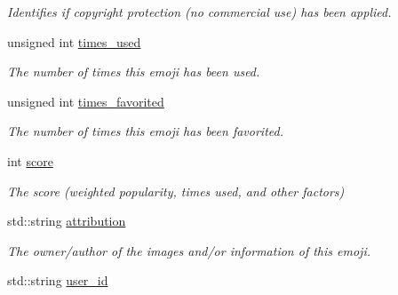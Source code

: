 \begin{DoxyCompactItemize}
\begin{DoxyCompactList}\small\item\em Identifies if copyright protection (no commercial use) has been applied. \end{DoxyCompactList}\item 
unsigned int \hyperlink{classEmojidex_1_1Data_1_1Emoji_a12b0bac434266f28c90f4029cf345281}{times\+\_\+used}\hypertarget{classEmojidex_1_1Data_1_1Emoji_a12b0bac434266f28c90f4029cf345281}{}\label{classEmojidex_1_1Data_1_1Emoji_a12b0bac434266f28c90f4029cf345281}

\begin{DoxyCompactList}\small\item\em The number of times this emoji has been used. \end{DoxyCompactList}\item 
unsigned int \hyperlink{classEmojidex_1_1Data_1_1Emoji_ac069cd3bd86d55df3f95ff3e553c52ca}{times\+\_\+favorited}\hypertarget{classEmojidex_1_1Data_1_1Emoji_ac069cd3bd86d55df3f95ff3e553c52ca}{}\label{classEmojidex_1_1Data_1_1Emoji_ac069cd3bd86d55df3f95ff3e553c52ca}

\begin{DoxyCompactList}\small\item\em The number of times this emoji has been favorited. \end{DoxyCompactList}\item 
int \hyperlink{classEmojidex_1_1Data_1_1Emoji_ad8c90a6c15d02e99f29dac204f1e38d2}{score}\hypertarget{classEmojidex_1_1Data_1_1Emoji_ad8c90a6c15d02e99f29dac204f1e38d2}{}\label{classEmojidex_1_1Data_1_1Emoji_ad8c90a6c15d02e99f29dac204f1e38d2}

\begin{DoxyCompactList}\small\item\em The score (weighted popularity, times used, and other factors) \end{DoxyCompactList}\item 
std\+::string \hyperlink{classEmojidex_1_1Data_1_1Emoji_a0670281a397e7bf106c0661d57fa8f0a}{attribution}\hypertarget{classEmojidex_1_1Data_1_1Emoji_a0670281a397e7bf106c0661d57fa8f0a}{}\label{classEmojidex_1_1Data_1_1Emoji_a0670281a397e7bf106c0661d57fa8f0a}

\begin{DoxyCompactList}\small\item\em The owner/author of the images and/or information of this emoji. \end{DoxyCompactList}\item 
std\+::string \hyperlink{classEmojidex_1_1Data_1_1Emoji_a279314b6aa4626e05b1bf2bc7acb75d1}{user\+\_\+id}\hypertarget{classEmojidex_1_1Data_1_1Emoji_a279314b6aa4626e05b1bf2bc7acb75d1}{}\label{classEmojidex_1_1Data_1_1Emoji_a279314b6aa4626e05b1bf2bc7acb75d1}


\end{DoxyCompactItemize}
